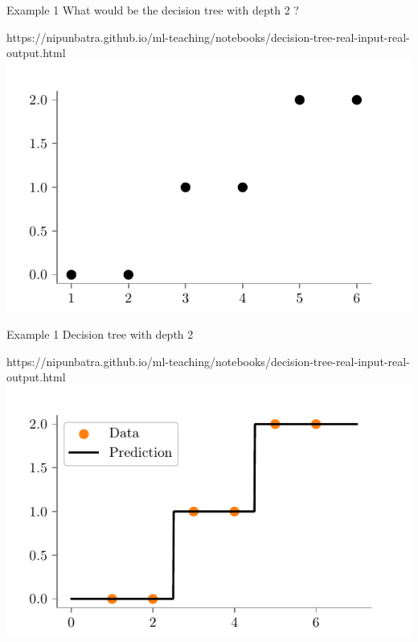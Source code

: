 \documentclass[usenames,dvipsnames]{beamer}
\begin{document}
    \begin{frame}{Example 1}
    What would be the decision tree with depth 2	?
    \begin{center}
    	\begin{notebookbox}{https://nipunbatra.github.io/ml-teaching/notebooks/decision-tree-real-input-real-output.html}
    		\includegraphics{../assets/decision-trees/figures/ri-ro-dataset.pdf}
    	  \end{notebookbox}
    \end{center}
    \end{frame}

    \begin{frame}{Example 1}
        Decision tree with depth 2
        \begin{center}
        \begin{notebookbox}{https://nipunbatra.github.io/ml-teaching/notebooks/decision-tree-real-input-real-output.html}
            \includegraphics{../assets/decision-trees/figures/ri-ro-depth-2.pdf}
        \end{notebookbox}
        \end{center}
    \end{frame}
	
\end{document}

